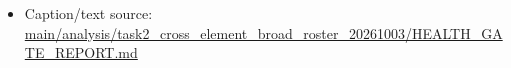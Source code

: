 \begin{itemize}[leftmargin=1.4em,noitemsep]
\item Caption/text source: \begingroup\scriptsize\url{main/analysis/task2_cross_element_broad_roster_20261003/HEALTH_GATE_REPORT.md}\endgroup
\end{itemize}
